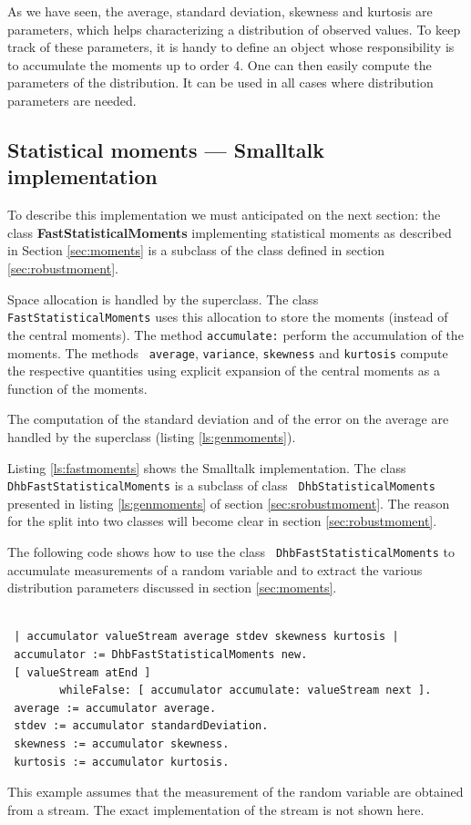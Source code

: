 As we have seen, the average, standard deviation, skewness and
kurtosis are parameters, which helps characterizing a distribution
of observed values. To keep track of these parameters, it is handy
to define an object whose responsibility is to accumulate the
moments up to order 4. One can then easily compute the parameters
of the distribution. It can be used in all cases where
distribution parameters are needed.

\subsection{Statistical moments --- Smalltalk implementation}
 To describe this implementation
we must anticipated on the next section: the class {\bf
FastStatisticalMoments} implementing statistical moments as
described in Section \ref{sec:moments} is a subclass of the class
defined in section \ref{sec:robustmoment}.

Space allocation is handled by the superclass. The class {\tt
FastStatisticalMoments} uses this allocation to store the moments
(instead of the central moments). The method {\tt accumulate:}
perform the accumulation of the moments. The methods {\tt
average}, {\tt variance}, {\tt skewness} and {\tt kurtosis}
compute the respective quantities using explicit expansion of the
central moments as a function of the moments.

The computation of the standard deviation and of the error on the
average are handled by the superclass (\cf listing
\ref{ls:genmoments}).

\label{sec:smoments}Listing \ref{ls:fastmoments} shows the
Smalltalk implementation. The class {\tt
DhbFastStatisticalMoments} is a subclass of class {\tt
DhbStatisticalMoments} presented in listing \ref{ls:genmoments} of
section \ref{sec:srobustmoment}. The reason for the split into two
classes will become clear in section \ref{sec:robustmoment}.

The following code shows how to use the class {\tt
DhbFastStatisticalMoments} to accumulate measurements of a random
variable and to extract the various distribution parameters
discussed in section \ref{sec:moments}.
\begin{codeExample}
\label{ex:smoments}
\begin{verbatim}

 | accumulator valueStream average stdev skewness kurtosis |
 accumulator := DhbFastStatisticalMoments new.
 [ valueStream atEnd ]
        whileFalse: [ accumulator accumulate: valueStream next ].
 average := accumulator average.
 stdev := accumulator standardDeviation.
 skewness := accumulator skewness.
 kurtosis := accumulator kurtosis.
\end{verbatim}
\end{codeExample}
This example assumes that the measurement of the random variable
are obtained from a stream. The exact implementation of the stream
is not shown here.

